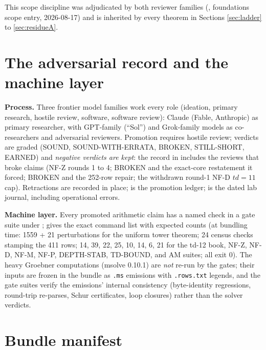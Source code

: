 \documentclass[11pt]{article}
\theoremstyle{definition}
\theoremstyle{remark}
\begin{document}
This scope discipline was adjudicated by both reviewer families
(, foundations scope entry, 2026-08-17) and is inherited by
every theorem in Sections \ref{sec:ladder} to \ref{sec:residueA}.

\section{The adversarial record and the machine layer}\label{sec:record}

\textbf{Process.} Three frontier model families work every role (ideation,
primary research, hostile review, software, software review): Claude
(Fable, Anthropic) as primary researcher, with GPT-family (``Sol'') and
Grok-family models as co-researchers and adversarial reviewers. Promotion
requires hostile review; verdicts are graded (SOUND, SOUND-WITH-ERRATA,
BROKEN, STILL-SHORT, EARNED) and \emph{negative verdicts are kept}: the
record in  includes the reviews that broke claims (NF-Z rounds
1 to 4;  BROKEN and the exact-core restatement it
forced;  BROKEN and the 252-row repair;
the withdrawn round-1 NF-D $td=11$ cap). Retractions are recorded in place;
 is the promotion ledger;  is the dated lab
journal, including operational errors.

\textbf{Machine layer.} Every promoted arithmetic claim has a named check
in a gate suite under ;  gives the exact
command list with expected counts (at bundling time: 1559 + 21
perturbations for the uniform tower theorem; 24 census checks stamping the
411 rows; 14, 39, 22, 25, 10, 14, 6, 21 for the td-12 book, NF-Z, NF-D,
NF-M, NF-P, DEPTH-STAB, TD-BOUND, and AM suites; all exit 0). The heavy
Groebner computations (msolve 0.10.1) are \emph{not} re-run by the gates;
their inputs are frozen in the bundle as \texttt{.ms} emissions with
\texttt{.rows.txt} legends, and the gate suites verify the emissions'
internal consistency (byte-identity regressions, round-trip re-parses,
Schur certificates, loop closures) rather than the solver verdicts.

\section{Bundle manifest}\label{sec:manifest}
\end{document}

